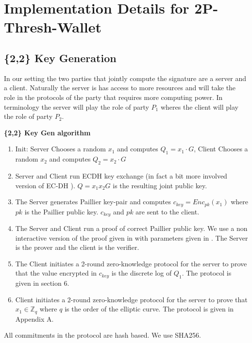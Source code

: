 \documentclass[runningheads]{llncs}
\begin{document}
\section{Implementation Details for 2P-Thresh-Wallet}
\subsection{\{2,2\} Key Generation}
In our setting the two parties that jointly compute the signature are a server and a client. Naturally the server is  has access to more resources and will take the role in the protocols of the party that requires more computing power. In \cite{lindell17} terminology the server will play the role of party ${P_1}$ wheres the client will play the role of party ${P_2}$.

\begin{mdframed}[userdefinedwidth = 12.3cm]
\textbf{\{2,2\} Key Gen algorithm}
\begin{enumerate}
\item Init: Server Chooses a random ${x_1}$  and computes ${Q_1 = x_1 \cdot G}$, Client Chooses a random ${x_2}$  and computes ${Q_2 = x_2 \cdot G}$
\item Server and Client run ECDH key exchange (in fact a bit more involved version of EC-DH \cite{lindell17}). $Q=x_1x_2G$ is the resulting joint public key.
\item The Server generates Paillier key-pair and computes ${c_{key} =Enc_{pk}(x_1)}$ where ${pk}$ is the Paillier public key. ${c_{key}}$ and ${pk}$ are sent to the client.
\item The Server and Client run a proof of correct Paillier public key. We use a non interactive version of the proof given in \cite{sharon} with parameters given in \cite{lindell18}. The Server is the prover and the client is the verifier.
\item The Client initiates a 2-round zero-knowledge protocol for the server to prove that the value encrypted in ${c_{key}}$ is the discrete log of ${Q_1}$. The protocol is given in \cite{lindell17} section 6.
\item Client initiates a 2-round zero-knowledge protocol for the server to prove that ${x_1 \in \mathbb{Z}_q}$ where ${q}$ is the order of the elliptic curve. The protocol is given in \cite{lindell17} Appendix A.
\end{enumerate}

\end{mdframed}

All commitments in the protocol are hash based. We use SHA256.
\end{document}
